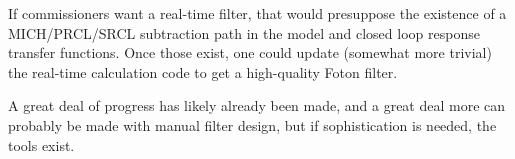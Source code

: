 If commissioners want a real-time filter, that would presuppose the existence of a MICH/PRCL/SRCL subtraction path in the model and closed loop response transfer functions. Once those exist, one could update (somewhat more trivial) the real-time calculation code to get a high-quality Foton filter.

A great deal of progress has likely already been made, and a great deal more can probably be made with manual filter design, but if sophistication is needed, the tools exist.




%
%

%

